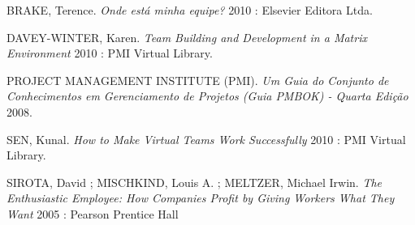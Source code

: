\documentclass[12pt]{article} %
\begin{document}
\begin{thebibliography}{1}

   BRAKE, Terence. {\em Onde está minha equipe?} 2010 : Elsevier Editora Ltda.

   DAVEY-WINTER, Karen. {\em Team Building and Development in a Matrix Environment} 2010 : PMI Virtual Library.

   PROJECT MANAGEMENT INSTITUTE (PMI). {\em Um Guia do Conjunto de Conhecimentos em Gerenciamento
   de Projetos (Guia PMBOK\textregistered) - Quarta Edição} 2008.

   SEN, Kunal. {\em How to Make Virtual Teams Work Successfully} 2010 : PMI Virtual Library.

   SIROTA, David ; MISCHKIND, Louis A. ; MELTZER, Michael Irwin. {\em The Enthusiastic Employee: How 
  Companies Profit by Giving Workers What They Want} 2005 : Pearson Prentice Hall

  \end{thebibliography}
\end{document}
